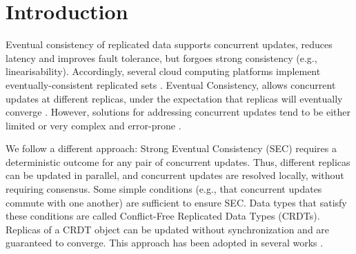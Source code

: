 \documentclass[a4paper]{article}
\begin{document}


\makeRR

\section{Introduction}

Eventual consistency of
replicated data supports concurrent updates, reduces latency and improves
fault tolerance, but forgoes strong consistency (e.g., linearisability).
Accordingly, several cloud computing platforms implement
eventually-consistent replicated sets
\cite{app:rep:optim:1606,rep:syn:1661}.
Eventual Consistency, allows concurrent
updates at different replicas, under the expectation that replicas will
eventually converge \cite{rep:syn:pan:1624}.
However, solutions for addressing concurrent updates tend to be either
limited or very complex and error-prone \cite{optim:rep:syn:1500}.

We follow a different approach: 
Strong Eventual Consistency (SEC) \cite{syn:rep:sh143} 
requires a deterministic outcome for any pair of
concurrent updates. Thus, different replicas can be updated in parallel,
and concurrent updates are resolved locally, without requiring consensus.
Some simple conditions (e.g., that concurrent updates commute with
one another) are sufficient to ensure SEC\@.
Data types that satisfy these conditions are called Conflict-Free
Replicated Data Types (CRDTs).
Replicas of a CRDT object can be updated without synchronization and
are guaranteed to converge.
This approach has been adopted in several works
\cite{app:rep:optim:1501,db:rep:1651,alg:rep:sh131,app:rep:1652,rep:syn:1661}.
\end{document}
